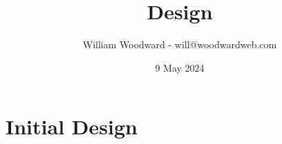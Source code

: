 \documentclass[10pt]{article}
\title{Design}
\date{9 May 2024}
\author{
William Woodward - will@woodwardweb.com
}
\begin{document}
\maketitle

\pagebreak
\tableofcontents

\pagebreak

\section{Initial Design}


% 
% 
\end{document}
